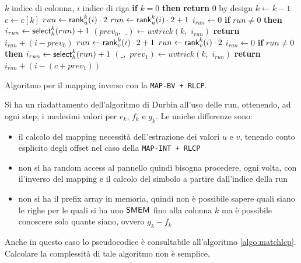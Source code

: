 \begin{algorithm}
  \begin{algorithmic}[1]
    \Comment $k$ indice di colonna, $i$ indice di riga
    \State \textbf{if} $k=0$ \textbf{then} \textbf{return} $0$
    \Comment by design
    \State $k\gets k-1$
    \State $c\gets c[k]$
    \State $run\gets \mbox{\rm {\sf rank}}_u^{k}(i)\cdot 2$
    \Else
    \State $run\gets \mbox{\rm {\sf rank}}_u^{k}(i)\cdot 2+1$
    \EndIf
    \State $i_{run}\gets 0$
    \State \textbf{if} $run\neq 0$ \textbf{then} $i_{run}\gets
    \mbox{\rm {\sf select}}_h^{k}(run)+1$ 
    \State $(prev_0,\,\,\_)\gets uvtrick(k,\,\,i_{run})$
    \State \textbf{return} $i_{run}+(i-prev_0)$
    \Else
    \State $run\gets \mbox{\rm {\sf rank}}_v^{k}(i)\cdot 2+1$
    \Else
    \State $run\gets \mbox{\rm {\sf rank}}_v^{k}(i)\cdot 2$
    \EndIf
    \State $i_{run}\gets 0$
    \State \textbf{if} $run\neq 0$ \textbf{then} $i_{run}\gets
    \mbox{\rm {\sf select}}_h^{k}(run)+1$ 
    \State $(\_,\,\,prev_1)\gets uvtrick(k,\,\,i_{run})$
    \State \textbf{return} $i_{run}+(i-(c+prev_1))$
    \EndIf
    \EndFunction
  \end{algorithmic}
  \caption{Algoritmo per il mapping inverso con la \texttt{MAP-BV + RLCP}.}
  \label{algo:lfrevbv}
\end{algorithm}
Si ha un riadattamento dell'algoritmo di Durbin all'uso delle run,
ottenendo, ad ogni step, i medesimi valori per $e_k$, $f_k$ e $g_k$. Le uniche
differenze sono:
\begin{itemize}
  \item il calcolo del mapping necessità dell'estrazione dei valori $u$ e $v$,
  tenendo conto esplicito degli offset nel caso della \texttt{MAP-INT + RLCP}
  \item non si ha random access al pannello quindi bisogna procedere,
  ogni volta, con il'inverso del mapping e il calcolo del simbolo a partire
  dall'indice della run
  \item non si ha il prefix array in memoria, quindi non è possibile
  sapere quali siano le righe per le quali si ha uno $\mbox{\rm {\sf SMEM}}$ fino alla colonna
  $k$ ma è possibile conoscere solo quante siano, ovvero $g_k-f_k$
\end{itemize}
Anche in questo caso lo pseudocodice è consultabile all'algoritmo
\ref{algo:matchlcp}. Calcolare la complessità di tale algoritmo non è semplice,
